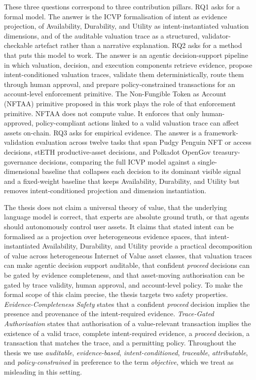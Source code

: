 These three questions correspond to three contribution pillars. RQ1 asks for a formal model. The answer is the ICVP formalisation of intent as evidence projection, of Availability, Durability, and Utility as intent-instantiated valuation dimensions, and of the auditable valuation trace as a structured, validator-checkable artefact rather than a narrative explanation. RQ2 asks for a method that puts this model to work. The answer is an agentic decision-support pipeline in which valuation, decision, and execution components retrieve evidence, propose intent-conditioned valuation traces, validate them deterministically, route them through human approval, and prepare policy-constrained transactions for an account-level enforcement primitive. The Non-Fungible Token as Account (NFTAA) primitive proposed in this work plays the role of that enforcement primitive. NFTAA does not compute value. It enforces that only human-approved, policy-compliant actions linked to a valid valuation trace can affect assets on-chain. RQ3 asks for empirical evidence. The answer is a framework-validation evaluation across twelve tasks that span Pudgy Penguin NFT or access decisions, stETH productive-asset decisions, and Polkadot OpenGov treasury-governance decisions, comparing the full ICVP model against a single-dimensional baseline that collapses each decision to its dominant visible signal and a fixed-weight baseline that keeps Availability, Durability, and Utility but removes intent-conditioned projection and dimension instantiation.

The thesis does not claim a universal theory of value, that the underlying language model is correct, that experts are absolute ground truth, or that agents should autonomously control user assets. It claims that stated intent can be formalised as a projection over heterogeneous evidence spaces, that intent-instantiated Availability, Durability, and Utility provide a practical decomposition of value across heterogeneous Internet of Value asset classes, that valuation traces can make agentic decision support auditable, that confident \textit{proceed} decisions can be gated by evidence completeness, and that asset-moving authorisation can be gated by trace validity, human approval, and account-level policy. To make the formal scope of this claim precise, the thesis targets two safety properties. \emph{Evidence-Completeness Safety} states that a confident \textit{proceed} decision implies the presence and provenance of the intent-required evidence. \emph{Trace-Gated Authorisation} states that authorisation of a value-relevant transaction implies the existence of a valid trace, complete intent-required evidence, a \textit{proceed} decision, a transaction that matches the trace, and a permitting policy. Throughout the thesis we use \emph{auditable}, \emph{evidence-based}, \emph{intent-conditioned}, \emph{traceable}, \emph{attributable}, and \emph{policy-constrained} in preference to the term \emph{objective}, which we treat as misleading in this setting.

